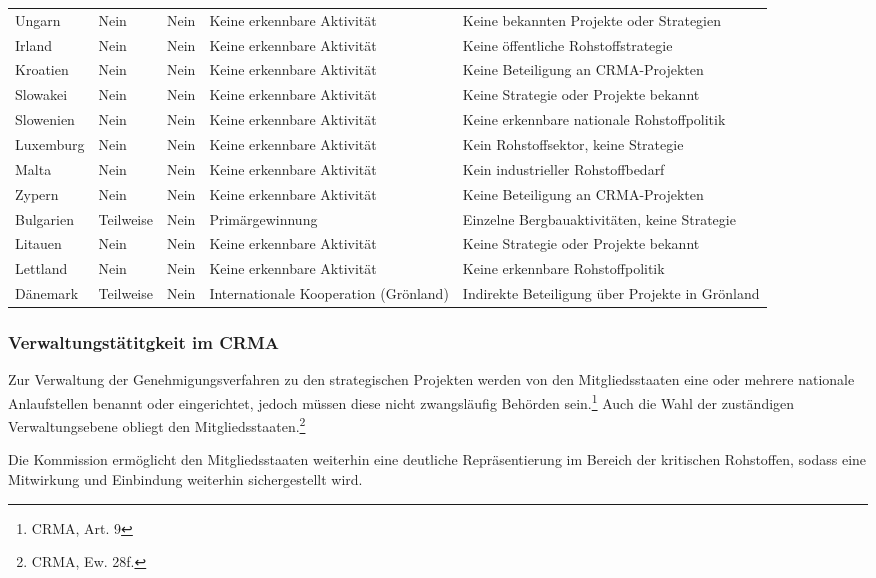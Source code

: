 \documentclass[12pt,a4paper,oneside]{book} %
\begin{document}
\begin{table}[htbp]
\begin{tabular}{|p{3cm}|p{2.5cm}|p{2.5cm}|p{4cm}|p{6cm}|}
		Ungarn & Nein & Nein & Keine erkennbare Aktivität & Keine bekannten Projekte oder Strategien \\
		Irland & Nein & Nein & Keine erkennbare Aktivität & Keine öffentliche Rohstoffstrategie \\
		Kroatien & Nein & Nein & Keine erkennbare Aktivität & Keine Beteiligung an CRMA-Projekten \\
		Slowakei & Nein & Nein & Keine erkennbare Aktivität & Keine Strategie oder Projekte bekannt \\
		Slowenien & Nein & Nein & Keine erkennbare Aktivität & Keine erkennbare nationale Rohstoffpolitik \\
		Luxemburg & Nein & Nein & Keine erkennbare Aktivität & Kein Rohstoffsektor, keine Strategie \\
		Malta & Nein & Nein & Keine erkennbare Aktivität & Kein industrieller Rohstoffbedarf \\
		Zypern & Nein & Nein & Keine erkennbare Aktivität & Keine Beteiligung an CRMA-Projekten \\
		Bulgarien & Teilweise & Nein & Primärgewinnung & Einzelne Bergbauaktivitäten, keine Strategie \\
		Litauen & Nein & Nein & Keine erkennbare Aktivität & Keine Strategie oder Projekte bekannt \\
		Lettland & Nein & Nein & Keine erkennbare Aktivität & Keine erkennbare Rohstoffpolitik \\
		Dänemark & Teilweise & Nein & Internationale Kooperation (Grönland) & Indirekte Beteiligung über Projekte in Grönland \\
		\hline
	\end{tabular}
	\label{tab:crma_umsetzung}
\end{table}

\subsubsection{Verwaltungstätitgkeit im CRMA}

Zur Verwaltung der Genehmigungsverfahren zu den strategischen Projekten werden von den Mitgliedsstaaten eine oder mehrere nationale Anlaufstellen benannt oder eingerichtet, jedoch müssen diese nicht zwangsläufig Behörden sein.\footnote{CRMA, Art. 9} Auch die Wahl der zuständigen Verwaltungsebene obliegt den Mitgliedsstaaten.\footnote{CRMA, Ew. 28f.}

Die Kommission ermöglicht den Mitgliedsstaaten weiterhin eine deutliche Repräsentierung im Bereich der kritischen Rohstoffen, sodass eine Mitwirkung und Einbindung weiterhin sichergestellt wird.
\end{document}
